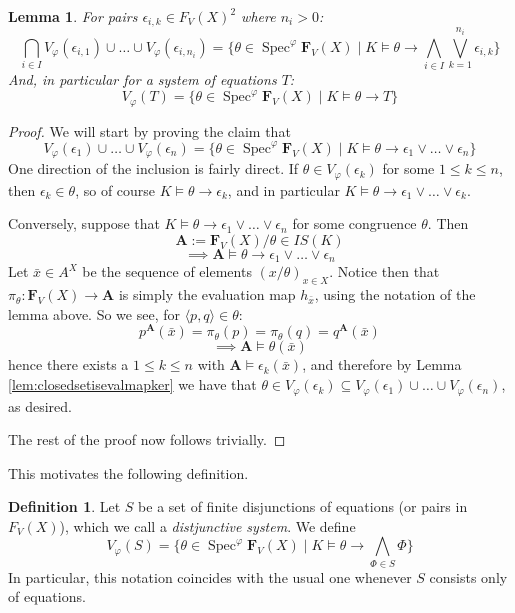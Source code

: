\documentclass{article}
\theoremstyle{plain}
\newtheorem{lemma}[theorem]{Lemma}
\theoremstyle{definition}
\newtheorem{definition}{Definition}[section]
\newcommand{\Spec}{\operatorname{Spec}}
\begin{document}
\begin{lemma} \label{lem:closedformZariskitop}
    For pairs $\epsilon_{i, k} \in F_V(X)^2$ where $n_i>0$:
    $$\bigcap_{i \in I} V_\varphi(\epsilon_{i, 1}) \cup\dots\cup V_\varphi(\epsilon_{i, n_i}) = \{ \theta \in \Spec^\varphi\mathbf{F}_V(X) \mid K\models \theta \rightarrow \bigwedge_{i \in I}\bigvee_{k=1}^{n_i} \epsilon_{i, k}\}$$
    And, in particular for a system of equations $T$:
    $$V_\varphi(T) = \{ \theta \in \Spec^\varphi \mathbf{F}_V(X) \mid K \models \theta \rightarrow T \}$$
\end{lemma}
\begin{proof}
    We will start by proving the claim that 
    $$V_\varphi(\epsilon_1) \cup \dots \cup V_\varphi(\epsilon_n) = \{ \theta \in \Spec^\varphi \mathbf{F}_V(X) \mid K \models \theta \to \epsilon_1 \vee \dots \vee \epsilon_n \}$$
    One direction of the inclusion is fairly direct.
    If $\theta \in V_\varphi(\epsilon_k)$ for some $1 \leq k \leq n$, then $\epsilon_k \in \theta$, so of course $K \models \theta \rightarrow \epsilon_k$, and in particular $K \models \theta \rightarrow \epsilon_1 \vee \dots \vee \epsilon_k$.\par
    Conversely, suppose that $K \models \theta \to \epsilon_1 \vee \dots \vee \epsilon_n$ for some congruence $\theta$.
    Then
    $$\mathbf{A} := \mathbf{F}_V(X) / \theta \in IS(K)$$
    $$\implies \mathbf{A} \models \theta \to \epsilon_1 \vee \dots \vee \epsilon_n$$
    Let $\bar{x} \in A^X$ be the sequence of elements $(x/\theta)_{x \in X}$.
    Notice then that $\pi_\theta \colon \mathbf{F}_V(X) \to \mathbf{A}$ is simply the evaluation map $h_{\bar{x}}$, using the notation of the lemma above.
    So we see, for $\langle p, q \rangle \in \theta$:
    $$p^\mathbf{A}(\bar{x}) = \pi_\theta(p) = \pi_\theta(q) = q^\mathbf{A}(\bar{x})$$
    $$\implies \mathbf{A} \models \theta(\bar{x})$$
    hence there exists a $1 \leq k \leq n$ with $\mathbf{A} \models \epsilon_k(\bar{x})$, and therefore by Lemma \ref{lem:closedsetisevalmapker} we have that $\theta \in V_\varphi(\epsilon_k) \subseteq V_\varphi(\epsilon_1) \cup \dots \cup V_\varphi(\epsilon_n)$, as desired.\par
    The rest of the proof now follows trivially.
\end{proof}

This motivates the following definition.

\begin{definition}
    Let $S$ be a set of finite disjunctions of equations (or pairs in $F_V(X)$), which we call a \textit{distjunctive system}.
    We define
    $$V_\varphi(S) = \{ \theta \in  \Spec^\varphi\mathbf{F}_V(X) \mid K\models \theta \rightarrow \bigwedge_{\Phi \in S}\Phi \}$$
    In particular, this notation coincides with the usual one whenever $S$ consists only of equations.
\end{definition}
\end{document}
